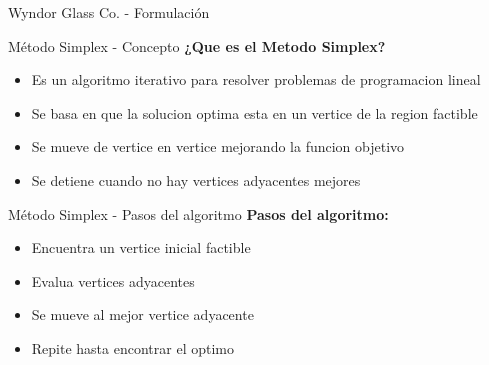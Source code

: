 \documentclass{beamer}
\begin{document}
\begin{frame}{Wyndor Glass Co. - Formulación}
    \vspace{1em}
    
\end{frame}

\begin{frame}{Método Simplex - Concepto}
    \textbf{¿Que es el Metodo Simplex?}
    \begin{itemize}
        \item Es un algoritmo iterativo para resolver problemas de programacion lineal
        \item Se basa en que la solucion optima esta en un vertice de la region factible
        \item Se mueve de vertice en vertice mejorando la funcion objetivo
        \item Se detiene cuando no hay vertices adyacentes mejores
    \end{itemize}
\end{frame}

\begin{frame}{Método Simplex - Pasos del algoritmo}
    \textbf{Pasos del algoritmo:}
    \begin{itemize}
        \item<1->[{\makebox[1em][c]{\textcolor{black}{\faSearch}}}] Encuentra un vertice inicial factible
        \item<2->[{\makebox[1em][c]{\textcolor{black}{\faMap}}}] Evalua vertices adyacentes
        \item<3->[{\makebox[1em][c]{\textcolor{black}{\faArrowRight}}}] Se mueve al mejor vertice adyacente
        \item<4->[{\makebox[1em][c]{\textcolor{black}{\faRandom}}}] Repite hasta encontrar el optimo
    \end{itemize}
\end{frame}
\end{document}
